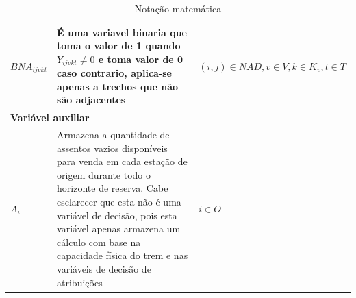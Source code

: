 \begin{table}[H]
\begin{tabular}{p{2cm} p{9.5cm} p{3.2cm}}
		$BNA_{ijvkt}$      & É uma variavel binaria que toma o valor de 1 quando $Y_{ijvkt} \neq 0$ e toma  valor de 0 caso contrario, aplica-se apenas a trechos que não são adjacentes & $(i,j) \in NAD, v \in V, k \in K_v, t \in T$ \\\midrule
		\multicolumn{3}{l}{\textbf{Variável auxiliar}}                                                                                                                                                                               \\ \midrule
		$A_{i}$            & Armazena a quantidade de assentos vazios disponíveis para venda em cada estação de origem durante todo o horizonte de reserva. Cabe esclarecer que esta não é uma variável de decisão, pois esta variável apenas armazena um cálculo com base na capacidade física do trem e nas variáveis de decisão de atribuições                                                                                                     & $i \in O$                                    \\
		\bottomrule
	\end{tabular}
	\caption{Notação matemática}
	\label{tab: m1_definicao}
\end{table}

